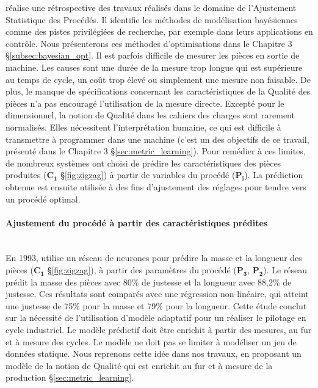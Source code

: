 \cite{del_castillo_statistical_2006} réalise une rétrospective des travaux réalisés dans le domaine de l'Ajustement Statistique des Procédés.
Il identifie les méthodes de modélisation bayésiennes comme des pistes privilégiées de recherche, par exemple dans leurs applications en contrôle.
Nous présenterons ces méthodes d'optimisations dans le Chapitre 3 §\ref{subsec:bayesian_opt}.
Il est parfois difficile de mesurer les pièces en sortie de machine.
Les causes sont une durée de la mesure trop longue qui est supérieure au temps de cycle, un coût trop élevé ou simplement une mesure non faisable.
De plus, le manque de spécifications concernant les caractéristiques de la Qualité des pièces n’a pas encouragé l’utilisation de la mesure directe.
Excepté pour le dimensionnel, la notion de Qualité dans les cahiers des charges sont rarement normalisés.
Elles nécessitent l'interprétation humaine, ce qui est difficile à transmettre à programmer dans une machine (c'est un des objectifs de ce travail, présenté dans le Chapitre 3 §\ref{sec:metric_learning}).
Pour remédier à ces limites, de nombreux systèmes ont choisi de prédire les caractéristiques des pièces produites ($\boldsymbol{C_1}$ §\ref{fig:zigzag}) à partir de variables du procédé ($\boldsymbol{P_i}$).
La prédiction obtenue est ensuite utilisée à des fins d’ajustement des réglages pour tendre vers un procédé optimal.

\paragraph{Ajustement du procédé à partir des caractéristiques prédites}\mbox{} \\
En 1993, \cite{haeussler_quality_1993} utilise un réseau de neurones pour prédire la masse et la longueur des pièces ($\boldsymbol{C_1}$ §\ref{fig:zigzag}), à partir des paramètres du procédé ($\boldsymbol{P_3}$, $\boldsymbol{P_2}$).
Le réseau prédit la masse des pièces avec 80\% de justesse et la longueur avec 88,2\% de justesse.
Ces résultats sont comparés avec une régression non-linéaire, qui atteint une justesse de 75\% pour la masse et 79\% pour la longueur.
Cette étude conclut sur la nécessité de l'utilisation d'modèle adaptatif pour un réaliser le pilotage en cycle industriel.
Le modèle prédictif doit être enrichit à partir des mesures, au fur et à mesure des cycles.
Le modèle ne doit pas se limiter à modéliser un jeu de données statique.
Nous reprenons cette idée dans nos travaux, en proposant un modèle de la notion de Qualité qui est enrichit au fur et à mesure de la production §\ref{sec:metric_learning}.

